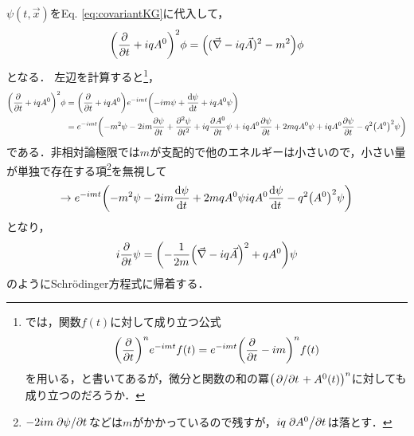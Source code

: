 \documentclass[english, dvipdfmx, a4paper]{jsarticle}
\theoremstyle{break}
\begin{document}
	$\psi(t, \vec{x}) $をEq. \eqref{eq:covariantKG}に代入して，
	\begin{equation}
			\qty(\pdv{}{t} + iqA^0)^2\phi = \qty((\vec{\nabla} - iq\vec{A})^2 -m^2)\phi
	\end{equation}
	となる．
	左辺を計算すると\footnote{\cite[p.55]{BB17130464}では，関数$f(t) $に対して成り立つ公式
	\begin{equation*}
			\qty(\pdv{}{t})^ne^{-imt}f(t) = e^{-imt}\qty(\pdv{}{t} - im)^n f(t)
	\end{equation*}
	を用いる，と書いてあるが，微分と関数の和の冪$\qty(\pdv*{}{t} + A^0(t))^n $に対しても成り立つのだろうか．
}，
	\begin{align}
			\qty(\pdv{}{t} + iqA^0)^2 \phi 
			&= \qty(\pdv{}{t} + iqA^0)e^{-imt}\qty(-im\psi + \dv{\psi}{t} + iqA^0\psi)\\
			&= e^{-imt}\qty(-m^2\psi -2im\pdv{\psi}{t} + \pdv[2]{\psi}{t} + iq\pdv{A^0}{t}\psi + iqA^0\pdv{\psi}{t} + 2mqA^0\psi + iqA^0\pdv{\psi}{t} - q^2\qty(A^0)^2\psi)
	\end{align}
	である．非相対論極限では$m $が支配的で他のエネルギーは小さいので，小さい量が単独で存在する項\footnote{$-2im\pdv*{\psi}{t} $などは$m $がかかっているので残すが，$iq\pdv*{A^0}{t} $は落とす．}を無視して
	\begin{equation}
			\to e^{-imt}\qty(-m^2\psi -2im\dv{\psi}{t} + 2mqA^0\psi  iqA^0\dv{\psi}{t} - q^2\qty(A^0)^2\psi)
	\end{equation}
	となり，
	\begin{equation}
			i\pdv{}{t}\psi = \qty(-\frac{1}{2m}\qty(\vec{\nabla} - iq\vec{A})^2 +qA^0)\psi
	\end{equation}
	のようにSchr\"{o}dinger方程式に帰着する．
	
	
\end{document}
